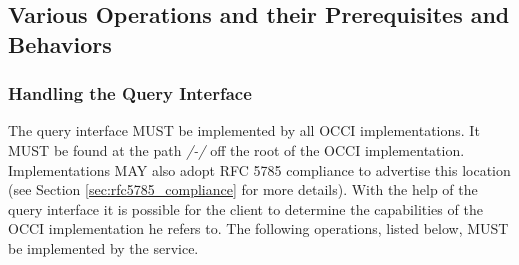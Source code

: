 \documentclass[10pt,a4paper]{article}
\begin{document}
\subsection{Various Operations and their Prerequisites and Behaviors}

\subsubsection{Handling the Query Interface}
\label{sec:query}
The query interface MUST be implemented by all OCCI
implementations. It MUST be found at the path \emph{/-/} off the root
of the OCCI implementation. Implementations MAY also 
adopt RFC 5785 \cite{rfc5785} compliance to advertise this location 
(see Section \ref{sec:rfc5785_compliance} for more details).
With the help of the query interface it is
possible for the client to determine the capabilities of the OCCI
implementation he refers to. The following operations, listed below,
MUST be implemented by the service.
\end{document}

